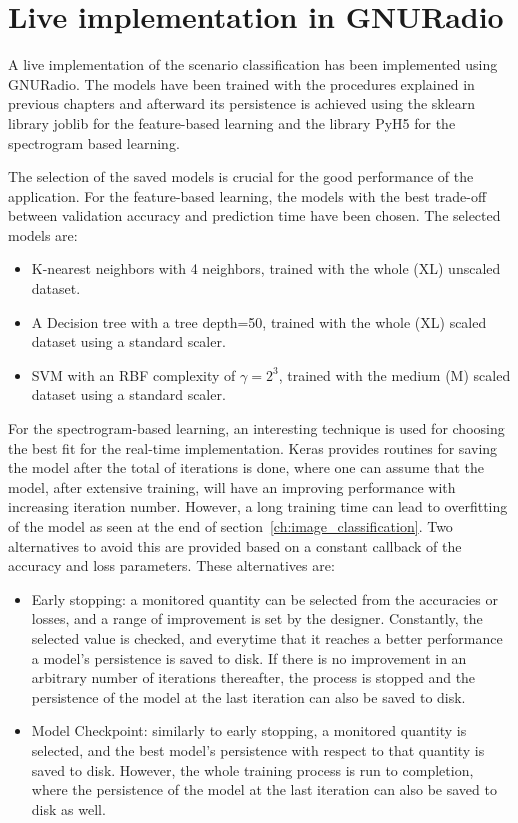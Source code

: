 \acresetall
\chapter{Live implementation in GNURadio}\label{chapter:live} \label{ch:live}

A live implementation of the scenario classification has been implemented using GNURadio. The models have been trained with the procedures explained in previous chapters and afterward its persistence is achieved using the sklearn library joblib for the feature-based learning and the library PyH5 for the spectrogram based learning.

The selection of the saved models is crucial for the good performance of the application. For the feature-based learning, the models with the best trade-off between validation accuracy and prediction time have been chosen. The selected models are:

\begin{itemize}
    \item K-nearest neighbors with 4 neighbors, trained with the whole (XL) unscaled dataset.
    \item A Decision tree with a tree depth=50, trained with the whole (XL) scaled dataset using a standard scaler.
    \item \ac{SVM} with an RBF complexity of \(\gamma=2^3\), trained with the medium (M) scaled dataset using a standard scaler.
\end{itemize}

For the spectrogram-based learning, an interesting technique is used for choosing the best fit for the real-time implementation. Keras provides routines for saving the model after the total of iterations is done, where one can assume that the model, after extensive training, will have an improving performance with increasing iteration number. However, a long training time can lead to overfitting of the model as seen at the end of section~\ref{ch:image_classification}. Two alternatives to avoid this are provided based on a constant callback of the accuracy and loss parameters. These alternatives are:

\begin{itemize}
    \item Early stopping: a monitored quantity can be selected from the accuracies or losses, and a range of improvement is set by the designer. Constantly, the selected value is checked, and everytime that it reaches a better performance a model's persistence is saved to disk. If there is no improvement in an arbitrary number of iterations thereafter, the process is stopped and the persistence of the model at the last iteration can also be saved to disk.
    \item Model Checkpoint: similarly to early stopping, a monitored quantity is selected, and the best model's persistence with respect to that quantity is saved to disk. However, the whole training process is run to completion, where the persistence of the model at the last iteration can also be saved to disk as well.
\end{itemize}


